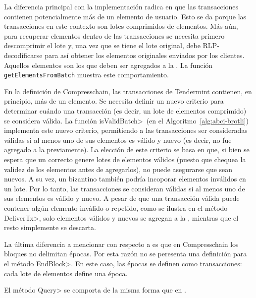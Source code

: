 La diferencia principal con la implementación \vanilla radica en que las transacciones contienen
potencialmente más de un elemento de usuario. Esto se da porque las transacciones en este contexto
son lotes comprimidos de elementos.
%
Más aún, para recuperar elementos dentro de las transacciones se necesita primero descomprimir
el lote y, una vez que se tiene el lote original, debe RLP-decodificarse para así obtener los elementos
originales enviados por los clientes.
%
Aquellos elementos son los que deben ser agregados a la \setchain. La función \texttt{getElementsFromBatch}
muestra este comportamiento.

En la definición de Compresschain, las transacciones de Tendermint contienen, en principio, más de un elemento.
%
Se necesita definir un nuevo criterio para determinar cuándo una transacción (es decir, un lote de elementos
comprimido) se considera válida.
%
La función \<isValidBatch>~(en el Algoritmo~\ref{alg:abci-brotli}) implementa este nuevo criterio, permitiendo
a las transacciones ser consideradas válidas si al menos uno de sus elementos es válido y nuevo (es decir,
no fue agregado a la \setchain previamente).
%
La elección de este criterio se basa en que, si bien se espera
que un \collector correcto genere lotes de elementos válidos (puesto que chequea la validez de los elementos
antes de agregarlos), no puede asegurarse que sean nuevos.
A su vez, un \collector bizantino también podría incoporar elementos inválidos en un lote.
%
Por lo tanto, las transacciones se consideran válidas si al menos uno de sus elementos es válido y nuevo.
%
A pesar de que una transacción válida puede contener algún elemento inválido o repetido,
como se ilustra en el método \<DeliverTx>, solo elementos válidos y nuevos se agregan a la \setchain,
mientras que el resto simplemente se descarta.
%

La última diferencia a mencionar con respecto a \vanilla es que en Compresschain los bloques no delimitan épocas.
Por esta razón no se peresenta una definición para el método \<EndBlock>.
En este caso, las épocas se definen como transacciones: cada lote de elementos define una época.

%
El método \<Query> se comporta de la misma forma que en \vanilla.

